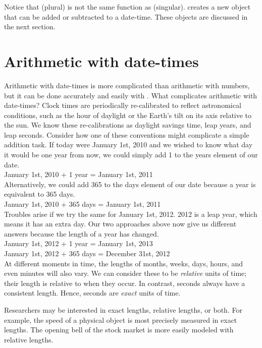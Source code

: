 \documentclass[article]{jss}
\begin{document}
Notice that  (plural) is not the same function as  (singular).  creates a new object that can be added or subtracted to a  date-time. These objects are discussed in the next section. 

\section{Arithmetic with date-times}
\label{sec:types}
Arithmetic with date-times is more complicated than arithmetic with numbers, but it can be done accurately and easily with . What complicates arithmetic with date-times? Clock times are periodically re-calibrated to reflect astronomical conditions, such as the hour of daylight or the Earth's tilt on its axis relative to the sun. We know these re-calibrations as daylight savings time, leap years, and leap seconds. Consider how one of these conventions might complicate a simple addition task. If today were January 1st, 2010 and we wished to know what day it would be one year from now, we could simply add 1 to the years element of our date.\\

January 1st, 2010 + 1 year = January 1st, 2011\\

Alternatively, we could add 365 to the days element of our date because a year is equivalent to 365 days. \\

January 1st, 2010 + 365 days = January 1st, 2011\\

Troubles arise if we try the same for January 1st, 2012. 2012 is a leap year, which means it has an extra day. Our two approaches above now give us different answers because the length of a year has changed.\\ 

January 1st, 2012 + 1 year = January 1st, 2013\\
January 1st, 2012 + 365 days = December 31st,  2012\\

At different moments in time, the lengths of months, weeks, days, hours, and even minutes will also vary. We can consider these to be \emph{relative} units of time; their length is relative to when they occur. In contrast, seconds always have a consistent length. Hence, seconds are \emph{exact} units of time.

Researchers may be interested in exact lengths, relative lengths, or both. For example, the speed of a physical object is most precisely measured in exact lengths. The opening bell of the stock market is more easily modeled with relative lengths.
\end{document}
